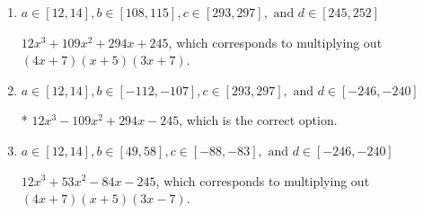 \documentclass{extbook}[14pt]
\begin{document}
\begin{enumerate}
{\begin{enumerate}[label=\Alph*.]
$12x^{3} -67 x^{2} -14 x + 245$, which corresponds to multiplying out $(4x + 7)(x -5)(3x -7)$.
\item \( a \in [12, 14], b \in [108, 115], c \in [293, 297], \text{ and } d \in [245, 252] \)

$12x^{3} +109 x^{2} +294 x + 245$, which corresponds to multiplying out $(4x + 7)(x + 5)(3x + 7)$.
\item \( a \in [12, 14], b \in [-112, -107], c \in [293, 297], \text{ and } d \in [-246, -240] \)

* $12x^{3} -109 x^{2} +294 x -245$, which is the correct option.
\item \( a \in [12, 14], b \in [49, 58], c \in [-88, -83], \text{ and } d \in [-246, -240] \)

$12x^{3} +53 x^{2} -84 x -245$, which corresponds to multiplying out $(4x + 7)(x + 5)(3x -7)$.
\end{enumerate}

}
\end{enumerate}
\end{document}
